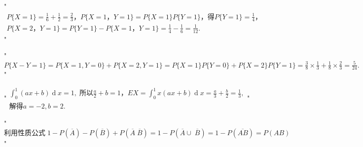 "$\begin{array}{l}P\{X=1\}=\frac16+\frac12=\frac23，P\{X=1，Y=1\}=P\{X=1\}P\{Y=1\}，得P\{Y=1\}=\frac14，\\P\{X=2，Y=1\}=P\{Y=1\}-P\{X=1，Y=1\}=\frac14-\frac16=\frac1{12}.\end{array}$"


"$P\{X-Y=1\}=P\{X=1,Y=0\}+P\{X=2,Y=1\}=P\{X=1\}P\{Y=0\}+P\{X=2\}P\{Y=1\}=\frac38\times\frac13+\frac18\times\frac23=\frac5{24}.$"


"$\begin{array}{l}\int_0^1(ax+b)\operatorname dx=1,\;\mathrm{所以}\frac a2+b=1，EX=\int_0^1x(ax+b)\operatorname dx=\frac a3+\frac b2=\frac13,\\\mathrm{解得}a=-2,b=2.\end{array}$"


"$\mathrm{利用性质公式}\;1-P(\overline A)-P(\overline B)+P(\overline A\;\overline B)=1-P(\overline A\cup\;\overline B)=1-P(\overline{AB})=P(AB)$"


